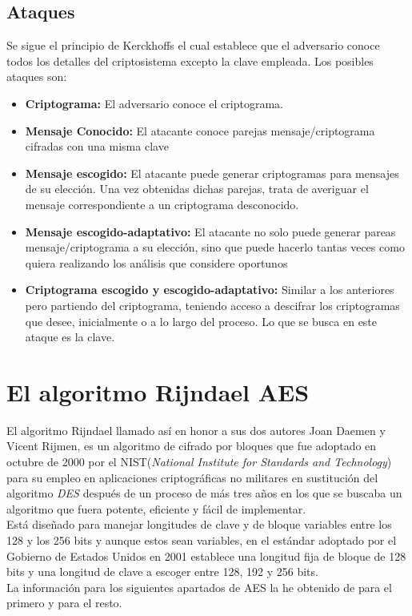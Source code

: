 \subsection{Ataques}
Se sigue el principio de Kerckhoffs el cual establece que el adversario conoce todos los detalles del criptosistema excepto la clave empleada. Los posibles ataques son:
\begin{itemize}
		\item \textbf{Criptograma:} El adversario conoce el criptograma.
		\item \textbf{Mensaje Conocido:} El atacante conoce parejas mensaje/criptograma cifradas con una misma clave
		\item \textbf{Mensaje escogido:} El atacante puede generar criptogramas para mensajes de su elección. Una vez obtenidas dichas parejas, trata de averiguar el mensaje correspondiente a un criptograma desconocido.
		\item \textbf{Mensaje escogido-adaptativo:} El atacante no solo puede generar pareas mensaje/criptograma a su elección, sino que puede hacerlo tantas veces como quiera realizando los análisis que considere oportunos
		\item \textbf{Criptograma escogido y escogido-adaptativo:} Similar a los anteriores pero partiendo del criptograma, teniendo acceso a descifrar los criptogramas que desee, inicialmente o a lo largo del proceso. Lo que se busca en este ataque es la clave.
\end{itemize}
\section{El algoritmo Rijndael AES}
El algoritmo Rijndael llamado así en honor a sus dos autores Joan Daemen y Vicent Rijmen, es un algoritmo de cifrado por bloques que fue adoptado en octubre de 2000 por el NIST(\emph{National Institute for Standards and Technology}) para su empleo en aplicaciones criptográficas no militares en sustitución del algoritmo \emph{DES} después de un proceso de más tres años en los que se buscaba un algoritmo que fuera potente, eficiente y fácil de implementar.\\
Está diseñado para manejar longitudes de clave y de bloque variables entre los 128 y los 256 bits y aunque estos sean variables, en el estándar adoptado por el Gobierno de Estados Unidos en 2001 \cite{aesUsa} establece una longitud fija de bloque de 128 bits y una longitud de clave a escoger entre 128, 192 y 256 bits.\\
La información para los siguientes apartados de AES la he obtenido de \cite{GomezPardo2002b} para el primero y \cite{En2011} para el resto.

